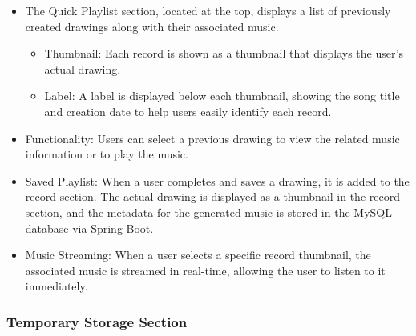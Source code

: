 \documentclass[conference]{IEEEtran}
\begin{document}
\begin{itemize}
    \item The Quick Playlist section, located at the top, displays a list of previously created drawings along with their associated music.
\begin{itemize}
    \item Thumbnail: Each record is shown as a thumbnail that displays the user’s actual drawing.\\
    \item Label: A label is displayed below each thumbnail, showing the song title and creation date to help users easily identify each record.\\
\end{itemize}
    \item Functionality: Users can select a previous drawing to view the related music information or to play the music.\\
    \item Saved Playlist: When a user completes and saves a drawing, it is added to the record section. The actual drawing is displayed as a thumbnail in the record section, and the metadata for the generated music is stored in the MySQL database via Spring Boot.\\
    \item Music Streaming: When a user selects a specific record thumbnail, the associated music is streamed in real-time, allowing the user to listen to it immediately.\\
\end{itemize}

\subsubsection{Temporary Storage Section}
\end{document}
